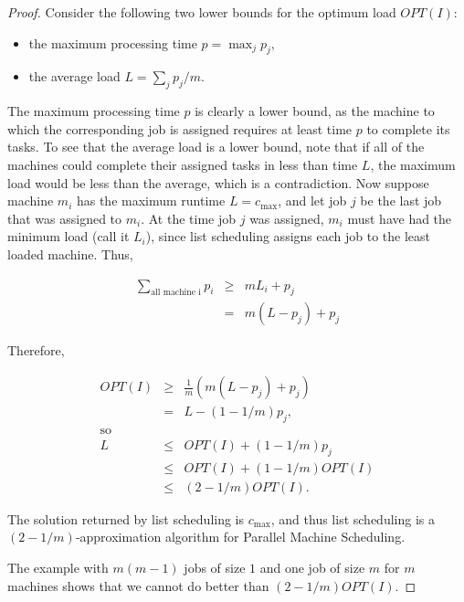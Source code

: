 \documentclass{article}
\begin{document}
\begin{proof}

Consider the following two lower bounds for the optimum load $OPT(I)$:

\begin{itemize}

\item the maximum processing time $p = \max_j p_j,$
\item the average load $L = \sum_j p_j/m.$

\end{itemize}

The maximum processing time $p$ is clearly a lower bound, as the machine to which the corresponding
job is assigned requires at least time $p$ to complete its tasks. To see that the average load is
a lower bound, note that if all of the machines could complete their assigned tasks in less than
time $L$, the maximum load would be less than the average, which is a contradiction. Now suppose
machine $m_i$ has the maximum runtime $L = c_{\max}$, and let job $j$ be the last job that was
assigned to $m_i$. At the time job $j$ was assigned, $m_i$ must have had the minimum load (call it
$L_i$), since list scheduling assigns each job to the least loaded machine. Thus,

$$
\begin{array}{lcl}
\sum\limits_{\mbox{all machine i}} p_i  & \ge & m L_i + p_j \\
                                    & = & m (L - p_j) + p_j
\end{array}
$$

Therefore,

$$
\begin{array} {lcl}
OPT(I)  & \ge & \frac{1}{m} \left( m (L - p_j) + p_j \right) \\
        & = & L - (1-1/m) p_j, \\
\mbox{so}        \\
L       & \le & OPT(I) + (1 - 1/m) p_j \\
        & \le & OPT(I) + (1 - 1/m) OPT(I) \\
        & \le & (2 - 1/m) OPT(I).
\end{array}
$$

The solution returned by list scheduling is $c_{\max}$, and thus list scheduling is a
$(2-1/m)$-approximation algorithm for Parallel Machine Scheduling.

The example with $m(m-1)$ jobs of size $1$ and one job of size $m$ for $m$ machines shows that we
cannot do better than $(2-1/m)OPT(I)$.

\end{proof}
\end{document}
